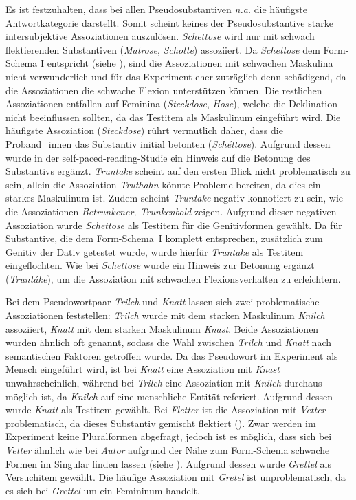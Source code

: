 Es ist festzuhalten, dass bei allen Pseudosubstantiven \textit{n.a.} die häufigste Antwortkategorie darstellt. Somit scheint keines der Pseudosubstantive starke intersubjektive Assoziationen auszulösen. \textit{Schettose} wird nur mit schwach flektierenden Substantiven (\textit{Matrose}, \textit{Schotte}) assoziiert. Da \textit{Schettose} dem Form-Schema I entspricht (siehe ), sind die Assoziationen mit schwachen Maskulina nicht verwunderlich und für das Experiment eher zuträglich denn schädigend, da die Assoziationen die schwache Flexion unterstützen können. Die restlichen Assoziationen entfallen auf Feminina (\textit{Steckdose}, \textit{Hose}), welche die Deklination nicht beeinflussen sollten, da das Testitem als Maskulinum eingeführt wird. Die häufigste Assoziation (\textit{Steckdose}) rührt vermutlich daher, dass die Proband\_innen das Substantiv initial betonten (\textit{Schéttose}). Aufgrund dessen wurde in der self-paced-reading-Studie ein Hinweis auf die Betonung des Substantivs ergänzt. \textit{Truntake} scheint auf den ersten Blick nicht problematisch zu sein, allein die Assoziation \textit{Truthahn} könnte Probleme bereiten, da dies ein starkes Maskulinum ist. Zudem scheint \textit{Truntake} negativ konnotiert zu sein, wie die Assoziationen \textit{Betrunkener, Trunkenbold} zeigen. Aufgrund dieser negativen Assoziation wurde \textit{Schettose} als Testitem für die Genitivformen gewählt. Da für Substantive, die dem Form-Schema~I komplett entsprechen, zusätzlich zum Genitiv der Dativ  getestet wurde, wurde hierfür \textit{Truntake} als Testitem eingeflochten. Wie bei \textit{Schettose} wurde ein Hinweis zur Betonung ergänzt (\textit{Truntáke}), um die Assoziation mit schwachen Flexionsverhalten zu erleichtern.

Bei dem Pseudowortpaar \textit{Trilch} und \textit{Knatt} lassen sich zwei problematische Assoziationen feststellen: \textit{Trilch} wurde mit dem starken Maskulinum \textit{Knilch} assoziiert, \textit{Knatt} mit dem starken Maskulinum \textit{Knast}. Beide Assoziationen wurden ähnlich oft genannt, sodass die Wahl zwischen \textit{Trilch} und \textit{Knatt} nach semantischen Faktoren getroffen wurde. Da das Pseudowort im Experiment als Mensch eingeführt wird, ist bei \textit{Knatt} eine Assoziation mit \textit{Knast} unwahrscheinlich, während bei \textit{Trilch} eine Assoziation mit \textit{Knilch} durchaus möglich ist, da \textit{Knilch} auf eine menschliche Entität referiert. Aufgrund dessen wurde \textit{Knatt} als Testitem gewählt. Bei \textit{Fletter} ist die Assoziation mit \textit{Vetter} problematisch, da dieses Substantiv gemischt flektiert (\cite{Duden.2020}). Zwar werden im Experiment keine Pluralformen abgefragt, jedoch ist es möglich, dass sich bei \textit{Vetter} ähnlich wie bei \textit{Autor} aufgrund der Nähe zum Form-Schema schwache Formen im Singular finden lassen (siehe ). Aufgrund dessen wurde \textit{Grettel} als Versuchitem gewählt. Die häufige Assoziation mit \textit{Gretel} ist unproblematisch, da es sich bei \textit{Grettel} um ein Femininum handelt. 


